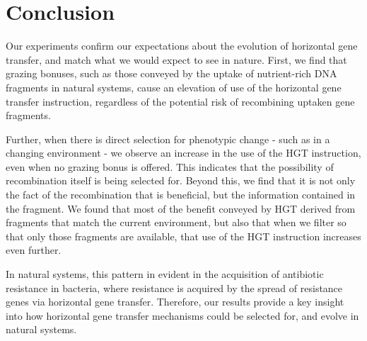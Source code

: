 \documentclass[PhD]{msu-thesis}
\begin{document}
\section{Conclusion}
Our experiments confirm our expectations about the evolution of horizontal gene transfer, and match what we would expect to see in nature. First, we find that grazing bonuses, such as those conveyed by the uptake of nutrient-rich DNA fragments in natural systems, cause an elevation of use of the horizontal gene transfer instruction, regardless of the potential risk of recombining uptaken gene fragments. 

Further, when there is direct selection for phenotypic change - such as in a changing environment - we observe an increase in the use of the HGT instruction, even when no grazing bonus is offered. This indicates that the possibility of recombination itself is being selected for. Beyond this, we find that it is not only the fact of the recombination that is beneficial, but the information contained in the fragment. We found that 
most of the benefit conveyed by HGT derived from fragments that match the current environment, but also that when we filter so that only those fragments are available, that use of the HGT instruction increases even further. 

In natural systems, this pattern in evident in the acquisition of antibiotic resistance in bacteria, where resistance is acquired by the spread of resistance genes via horizontal gene transfer. Therefore, our results provide a key insight into how horizontal gene transfer mechanisms could be selected for, and evolve in natural systems.
\end{document}
